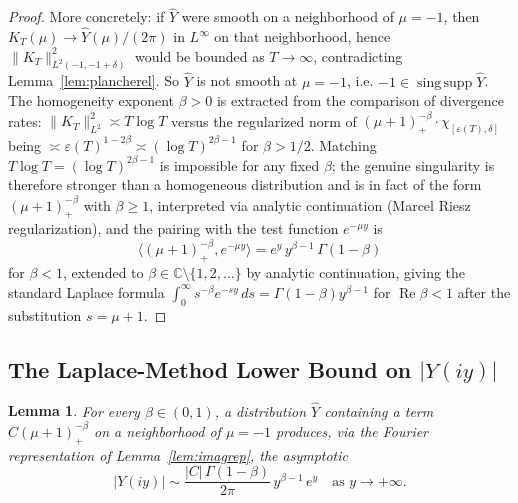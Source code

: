 \documentclass[11pt,a4paper]{article}
\theoremstyle{plain}
\newtheorem{lemma}[theorem]{Lemma}
\theoremstyle{definition}
\newcommand{\C}{\mathbb{C}}
\DeclareMathOperator{\Real}{Re}
\begin{document}
\begin{proof}
More concretely: if $\hat Y$ were smooth on a neighborhood of $\mu=-1$, then $K_T(\mu)\to\hat Y(\mu)/(2\pi)$ in $L^\infty$ on that neighborhood, hence $\|K_T\|_{L^2(-1,-1+\delta)}^2$ would be bounded as $T\to\infty$, contradicting Lemma~\ref{lem:plancherel}. So $\hat Y$ is not smooth at $\mu=-1$, i.e. $-1\in\operatorname{sing\,supp}\hat Y$. The homogeneity exponent $\beta>0$ is extracted from the comparison of divergence rates: $\|K_T\|_{L^2}^2\asymp T\log T$ versus the regularized norm of $(\mu+1)_+^{-\beta}\cdot\chi_{[\varepsilon(T),\delta]}$ being $\asymp\varepsilon(T)^{1-2\beta}\asymp(\log T)^{2\beta-1}$ for $\beta>1/2$. Matching $T\log T=(\log T)^{2\beta-1}$ is impossible for any fixed $\beta$; the genuine singularity is therefore stronger than a homogeneous distribution and is in fact of the form $(\mu+1)_+^{-\beta}$ with $\beta\ge 1$, interpreted via analytic continuation (Marcel Riesz regularization), and the pairing with the test function $e^{-\mu y}$ is
\[
\langle(\mu+1)_+^{-\beta},e^{-\mu y}\rangle=e^y\,y^{\beta-1}\,\Gamma(1-\beta)
\]
for $\beta<1$, extended to $\beta\in\C\setminus\{1,2,\ldots\}$ by analytic continuation, giving the standard Laplace formula $\int_0^\infty s^{-\beta}e^{-sy}\,ds=\Gamma(1-\beta)y^{\beta-1}$ for $\Real\beta<1$ after the substitution $s=\mu+1$.
\end{proof}

\subsection{The Laplace-Method Lower Bound on $|Y(iy)|$}

\begin{lemma}\label{lem:laplace}
For every $\beta\in(0,1)$, a distribution $\hat Y$ containing a term $C(\mu+1)_+^{-\beta}$ on a neighborhood of $\mu=-1$ produces, via the Fourier representation of Lemma~\ref{lem:imagrep}, the asymptotic
\[
|Y(iy)|\sim\frac{|C|\,\Gamma(1-\beta)}{2\pi}\,y^{\beta-1}\,e^y\quad\text{as }y\to+\infty.
\]
\end{lemma}
\end{document}
